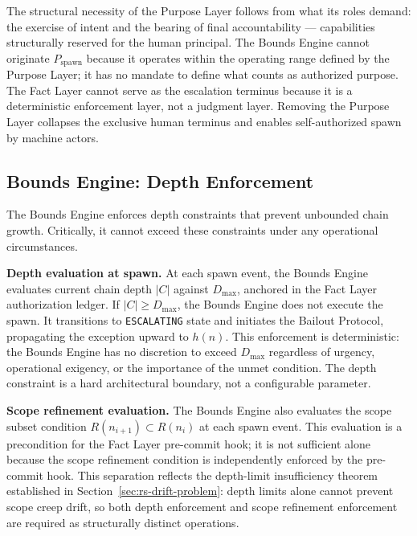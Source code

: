 The structural necessity of the Purpose Layer follows from what its roles demand: the exercise of intent and the bearing of final accountability — capabilities structurally reserved for the human principal. The Bounds Engine cannot originate $P_{\mathrm{spawn}}$ because it operates within the operating range defined by the Purpose Layer; it has no mandate to define what counts as authorized purpose. The Fact Layer cannot serve as the escalation terminus because it is a deterministic enforcement layer, not a judgment layer. Removing the Purpose Layer collapses the exclusive human terminus and enables self-authorized spawn by machine actors.

\subsection{Bounds Engine: Depth Enforcement}
\label{sec:rs-bounds-depth}

The Bounds Engine enforces depth constraints that prevent unbounded chain growth. Critically, it cannot exceed these constraints under any operational circumstances.

\medskip
\noindent\textbf{Depth evaluation at spawn.} At each spawn event, the Bounds Engine evaluates current chain depth $|C|$ against $D_{\mathrm{max}}$, anchored in the Fact Layer authorization ledger. If $|C| \geq D_{\mathrm{max}}$, the Bounds Engine does not execute the spawn. It transitions to \texttt{ESCALATING} state and initiates the Bailout Protocol, propagating the exception upward to $h(n)$. This enforcement is deterministic: the Bounds Engine has no discretion to exceed $D_{\mathrm{max}}$ regardless of urgency, operational exigency, or the importance of the unmet condition. The depth constraint is a hard architectural boundary, not a configurable parameter.

\medskip
\noindent\textbf{Scope refinement evaluation.} The Bounds Engine also evaluates the scope subset condition $R(n_{i+1}) \subset R(n_i)$ at each spawn event. This evaluation is a precondition for the Fact Layer pre-commit hook; it is not sufficient alone because the scope refinement condition is independently enforced by the pre-commit hook. This separation reflects the depth-limit insufficiency theorem established in Section~\ref{sec:rs-drift-problem}: depth limits alone cannot prevent scope creep drift, so both depth enforcement and scope refinement enforcement are required as structurally distinct operations.

